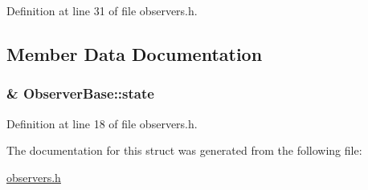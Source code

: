 Definition at line 31 of file observers.\+h.



\subsection{Member Data Documentation}
\subsubsection[{\texorpdfstring{state}{state}}]{\& Observer\+Base\+::state\hspace{0.3cm}{\ttfamily [protected]}}\hypertarget{struct_observer_base_a107ad54040309605fa5fafd481b97f2f}{}\label{struct_observer_base_a107ad54040309605fa5fafd481b97f2f}


Definition at line 18 of file observers.\+h.



The documentation for this struct was generated from the following file\+:\begin{DoxyCompactItemize}
\item 
\hyperlink{observers_8h}{observers.\+h}\end{DoxyCompactItemize}
